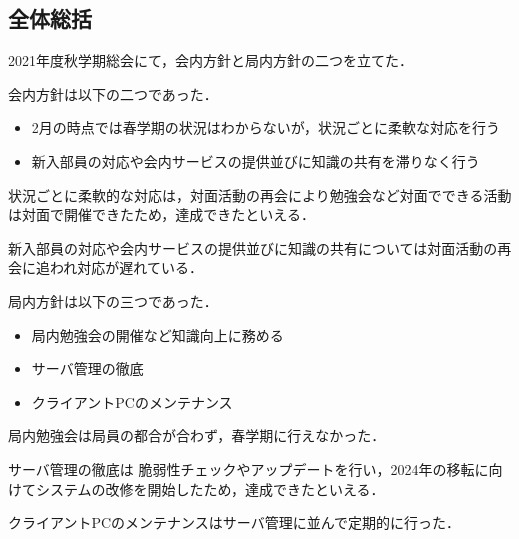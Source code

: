 \subsection*{全体総括}


2021年度秋学期総会にて，会内方針と局内方針の二つを立てた．

会内方針は以下の二つであった．
\begin{itemize}
  \item 2月の時点では春学期の状況はわからないが，状況ごとに柔軟な対応を行う
  \item 新入部員の対応や会内サービスの提供並びに知識の共有を滞りなく行う
\end{itemize}
状況ごとに柔軟的な対応は，対面活動の再会により勉強会など対面でできる活動は対面で開催できたため，達成できたといえる．

新入部員の対応や会内サービスの提供並びに知識の共有については対面活動の再会に追われ対応が遅れている．

局内方針は以下の三つであった．
\begin{itemize}
  \item 局内勉強会の開催など知識向上に務める
  \item サーバ管理の徹底
  \item クライアントPCのメンテナンス
\end{itemize}
局内勉強会は局員の都合が合わず，春学期に行えなかった．

サーバ管理の徹底は
脆弱性チェックやアップデートを行い，2024年の移転に向けてシステムの改修を開始したため，達成できたといえる．

クライアントPCのメンテナンスはサーバ管理に並んで定期的に行った．

